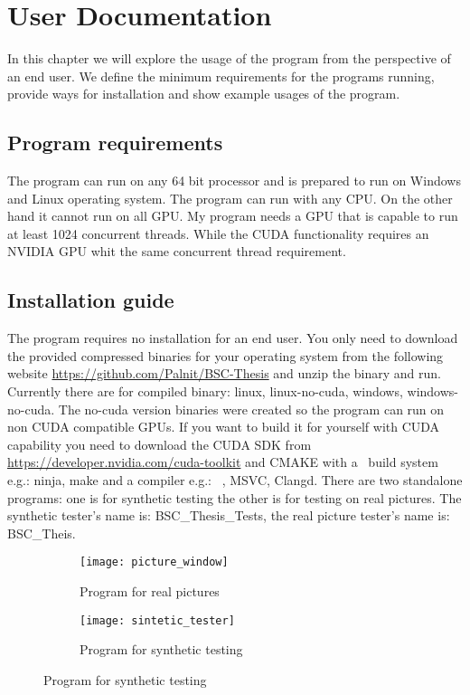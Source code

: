 \chapter{User Documentation}

In this chapter we will explore the usage of the program from the perspective of an end user. We define the minimum requirements for the programs running, provide ways for installation and show example usages of the program.

\section{Program requirements}

The program can run on any 64 bit processor and is prepared to run on Windows and Linux operating system. The program can run with any \ac{CPU}. On the other hand it cannot run on all \ac{GPU}. My program needs a \ac{GPU} that is capable to run at least 1024 concurrent threads. While the CUDA functionality requires an NVIDIA \ac{GPU} whit the same concurrent thread requirement.

\section{Installation guide}

The program requires no installation for an end user. You only need to download the provided compressed binaries for your operating system from the following website \href{https://github.com/Palnit/BSC-Thesis}{https://github.com/Palnit/BSC-Thesis} and unzip the binary and run. Currently there are for compiled binary: linux, linux-no-cuda, windows, windows-no-cuda. The no-cuda version binaries were created so the program can run on non CUDA compatible GPUs. If you want to build it for yourself with CUDA capability you need to download the CUDA SDK from \href{https://developer.nvidia.com/cuda-toolkit}{https://developer.nvidia.com/cuda-toolkit} and CMAKE with a \CC\ build system e.g.: ninja, make and a compiler e.g.: \GG\ , MSVC, Clangd. There are two standalone programs: one is for synthetic testing the other is for testing on real pictures. The synthetic tester's name is: BSC\_Thesis\_Tests, the real picture tester's name is: BSC\_Theis. 

\begin{figure}[H]
\begin{minipage}{.49\textwidth}
\begin{figure}[H]
\centering
\texttt{[image: picture\_window]}
\caption{Program for real pictures}
\label{fig:noraml_prog}
\end{figure}
\end{minipage}
\begin{minipage}{.49\textwidth}
\begin{figure}[H]
\centering
\texttt{[image: sintetic\_tester]}
\caption{Program for synthetic testing}
\label{fig:test_prog}
\end{figure}
\end{minipage}
\end{figure}

